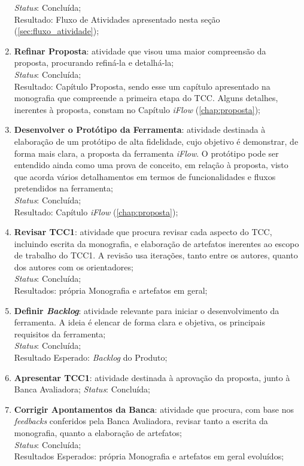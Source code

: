 \begin{enumerate}
    \textit{Status}: Concluída;
    \\
    Resultado: Fluxo de Atividades apresentado nesta seção (\ref{sec:fluxo_atividade});
    \item \textbf{Refinar Proposta}: atividade que visou uma maior compreensão da proposta, procurando refiná-la e detalhá-la;
    \\
    \textit{Status}: Concluída;
    \\
    Resultado: Capítulo Proposta, sendo esse um capítulo apresentado na monografia que compreende a primeira etapa do TCC. Alguns detalhes, inerentes à proposta, constam no Capítulo \textit{iFlow} (\ref{chap:proposta});
    \item \textbf{Desenvolver o Protótipo da Ferramenta}: atividade destinada à elaboração de um protótipo de alta fidelidade, cujo objetivo é demonstrar, de forma mais clara, a proposta da ferramenta \textit{iFlow}. O protótipo pode ser entendido ainda como uma prova de conceito, em relação à proposta, visto que acorda vários detalhamentos em termos de funcionalidades e fluxos pretendidos na ferramenta;
    \\
    \textit{Status}: Concluída;
    \\
    Resultado: Capítulo \textit{iFlow} (\ref{chap:proposta});
    \item \textbf{Revisar TCC1}: atividade que procura revisar cada aspecto do TCC, incluindo escrita da monografia, e elaboração de artefatos inerentes ao escopo de trabalho do TCC1. A revisão usa iterações, tanto entre os autores, quanto dos autores com os orientadores;
    \\
    \textit{Status}: Concluída;
    \\
    Resultados: própria Monografia e artefatos em geral;
    
    \item \textbf{Definir \textit{Backlog}}: atividade relevante para iniciar o desenvolvimento da ferramenta. A ideia é elencar de forma clara e objetiva, os principais requisitos da ferramenta;
    \\
    \textit{Status}: Concluída;
    \\
    Resultado Esperado: \textit{Backlog} do Produto;
    
    \item \label{item:revision} \textbf{Apresentar TCC1}: atividade destinada à aprovação da proposta, junto à Banca Avaliadora;
    \textit{Status}: Concluída;
    
    \item \textbf{Corrigir Apontamentos da Banca}: atividade que procura, com base nos \textit{feedbacks} conferidos pela Banca Avaliadora, revisar tanto a escrita da monografia, quanto a elaboração de artefatos;
    \\
    \textit{Status}: Concluída;
    \\
    Resultados Esperados: própria Monografia e artefatos em geral evoluídos;
    

\end{enumerate}
